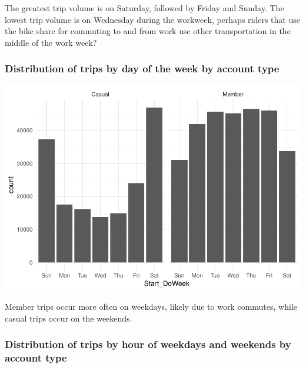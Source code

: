 \documentclass[]{article}
\newenvironment{Shaded}{\begin{snugshade}}{\end{snugshade}}
\newcommand{\KeywordTok}[1]{\textcolor[rgb]{0.13,0.29,0.53}{\textbf{#1}}}
\newcommand{\DataTypeTok}[1]{\textcolor[rgb]{0.13,0.29,0.53}{#1}}
\newcommand{\StringTok}[1]{\textcolor[rgb]{0.31,0.60,0.02}{#1}}
\newcommand{\OperatorTok}[1]{\textcolor[rgb]{0.81,0.36,0.00}{\textbf{#1}}}
\newcommand{\NormalTok}[1]{#1}
\begin{document}
The greatest trip volume is on Saturday, followed by Friday and Sunday.
The lowest trip volume is on Wednesday during the workweek, perhaps
riders that use the bike share for commuting to and from work use other
transportation in the middle of the work week?

\subsubsection{Distribution of trips by day of the week by account
type}\label{distribution-of-trips-by-day-of-the-week-by-account-type}

\begin{Shaded}
\end{Shaded}

\includegraphics{Nice_Ride_Project_Stat_ReportDRAFT_files/figure-latex/unnamed-chunk-5-1.pdf}

Member trips occur more often on weekdays, likely due to work commutes,
while casual trips occur on the weekends.

\subsubsection{Distribution of trips by hour of weekdays and weekends by
account
type}\label{distribution-of-trips-by-hour-of-weekdays-and-weekends-by-account-type}
\end{document}
